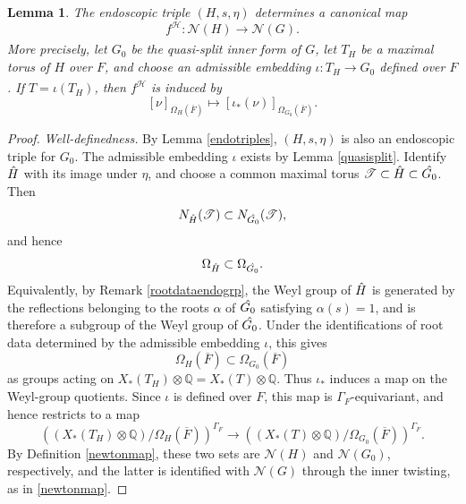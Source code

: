 \documentclass[11pt,a4paper]{article}
\theoremstyle{definition}
\theoremstyle{plain}
\newtheorem{Le}[shared]{Lemma}
\theoremstyle{remark}
\theoremstyle{plain}
\begin{document}
\begin{Le}\label{endoscopicnewtonmap}
    The endoscopic triple $(H,s,\eta)$ determines a canonical map
    $$f^{\mathcal H}: \mathcal{N}(H) \xrightarrow[]{} \mathcal{N}(G).$$
    More precisely, let $G_0$ be the quasi-split inner form of $G$, let $T_H$ be a maximal torus of $H$ over $F$, and choose an admissible embedding $\iota:T_H \xrightarrow[]{} G_0$ defined over $F$. If $T=\iota(T_H)$, then $f^{\mathcal H}$ is induced by
    $$[\nu]_{\Omega_H(\overline F)} \longmapsto [\iota_*(\nu)]_{\Omega_{G_0}(\overline F)}.$$
\end{Le}
\begin{proof}
    \textit{Well-definedness.} By Lemma \ref{endotriples}, $(H,s,\eta)$ is also an endoscopic triple for $G_0$. The admissible embedding $\iota$ exists by Lemma \ref{quasisplit}. Identify $\Hat{H}$ with its image under $\eta$, and choose a common maximal torus $\mathscr T \subset \Hat{H} \subset \Hat{G_0}$. Then
    $$N_{\Hat{H}}(\mathscr T) \subset N_{\Hat{G_0}}(\mathscr T),$$
    and hence
    $$\Omega_{\Hat{H}} \subset \Omega_{\Hat{G_0}}.$$
    Equivalently, by Remark \ref{rootdataendogrp}, the Weyl group of $\Hat{H}$ is generated by the reflections belonging to the roots $\alpha$ of $\Hat{G_0}$ satisfying $\alpha(s)=1$, and is therefore a subgroup of the Weyl group of $\Hat{G_0}$. Under the identifications of root data determined by the admissible embedding $\iota$, this gives
    $$\Omega_H(\overline F) \subset \Omega_{G_0}(\overline F)$$
    as groups acting on $X_*(T_H)\otimes\mathbb Q=X_*(T)\otimes\mathbb Q$. Thus $\iota_*$ induces a map on the Weyl-group quotients. Since $\iota$ is defined over $F$, this map is $\Gamma_F$-equivariant, and hence restricts to a map
    $$\left((X_*(T_H)\otimes\mathbb Q)/\Omega_H(\overline F)\right)^{\Gamma_F}
    \longrightarrow
    \left((X_*(T)\otimes\mathbb Q)/\Omega_{G_0}(\overline F)\right)^{\Gamma_F}.$$
    By Definition \ref{newtonmap}, these two sets are $\mathcal N(H)$ and $\mathcal N(G_0)$, respectively, and the latter is identified with $\mathcal N(G)$ through the inner twisting, as in \ref{newtonmap}.


\end{proof}
\end{document}
